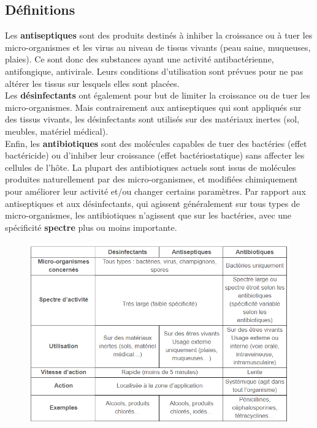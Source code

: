 \documentclass[11pt,a4paper]{report}
\begin{document}
\subsection{Définitions}

Les \textbf{antiseptiques} sont des produits destinés à inhiber la croissance ou à tuer les micro-organismes et les virus au niveau de tissus vivants (peau saine, muqueuses, plaies). Ce sont donc des substances ayant une activité antibactérienne, antifongique, antivirale. Leurs conditions d’utilisation sont prévues pour ne pas altérer les tissus sur lesquels elles sont placées.\\

Les \textbf{désinfectants} ont également pour but de limiter la croissance ou de tuer les micro-organismes. Mais contrairement aux antiseptiques qui sont appliqués sur des tissus vivants, les désinfectants sont utilisés sur des matériaux inertes (sol, meubles, matériel médical).\\

Enfin, les \textbf{antibiotiques} sont des molécules capables de tuer des bactéries (effet bactéricide) ou d'inhiber leur croissance (effet bactériostatique) sans affecter les cellules de l'hôte. La plupart des antibiotiques actuels sont issus de molécules produites naturellement par des micro-organismes, et modifiées chimiquement pour améliorer leur activité et/ou changer certains paramètres. Par rapport aux antiseptiques et aux désinfectants, qui agissent généralement sur tous types de micro-organismes, les antibiotiques n'agissent que sur les bactéries, avec une spécificité \textbf{spectre} plus ou moins importante.

\begin{figure}[h!]
\begin{center}
	\includegraphics[scale = 0.8]{antis.png}
	\label{fig:antis}
\end{center}
\end{figure}
\end{document}
